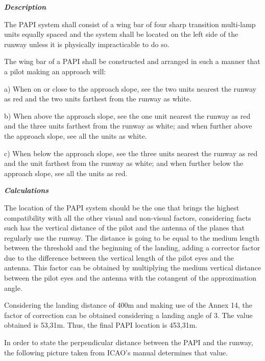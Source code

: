 		\textbf{\textit{Description}}
		
		The PAPI system shall consist of a wing bar of four sharp transition multi-lamp units
		equally spaced and the system shall be located on the left side of the runway unless it is physically impracticable to do so. 
		
		The wing bar of a PAPI shall be constructed and arranged in such a manner that a pilot making an approach
		will:
		
		a) When on or close to the approach slope, see the two units nearest the runway as red and the two units farthest from the runway as white.
		
		b) When above the approach slope, see the one unit nearest the runway as red and the three units farthest from the runway as white; and when further above the approach slope, see all the units as white.
		
		c) When below the approach slope, see the three units nearest the runway as red and the unit farthest from the runway as white; and when further below the approach slope, see all the units as red.
		
		\textbf{\textit{Calculations}}
		
		The location of the PAPI system should be the one that brings the highest compatibility with all the other visual and non-visual factors, considering facts such has the vertical distance of the pilot and the antenna of the planes that regularly use the runway. The distance is going to be equal to the medium length between the threshold and the beginning of the landing, adding a corrector factor due to the difference between the vertical length of the pilot eyes and the antenna. This factor can be obtained by multiplying the medium vertical distance between the pilot eyes and the antenna with the cotangent of the approximation angle. 
		
		Considering the landing distance of 400m and making use of the Annex 14, the factor of correction can be obtained considering a landing angle of 3\degree. The value obtained is 53,31m. Thus, the final PAPI location is 453,31m.
		
		In order to state the perpendicular distance between the PAPI and the runway, the following picture taken from ICAO's manual determines that value. 
		
